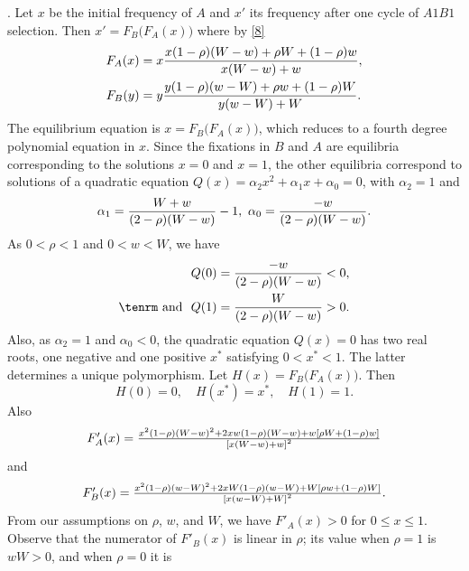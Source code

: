 \documentclass[9pt,twocolumn,twoside,lineno]{pnas-new}
\newcommand{\an}[1]{\begin{align}#1\end{align}}
\begin{document}
. Let $x$ be the initial frequency of $A$ and $x'$ its frequency  after one cycle of  $A1B1$ selection. Then $x' =F_B\bigl(F_A(x)\bigr)$ where by \eqref{8}
\begin{equation}
\an{
F_A(x)&=x{x(1-\rho)(W-w) +\rho W+(1-\rho)w\over x(W-w) +w},\\
F_B(y) &= y{y(1-\rho)(w-W) +\rho w+(1-\rho)W\over y(w-W)+W}.}
\label{21}\end{equation}
The equilibrium equation is $x=F_B\bigl(F_A(x)\bigr)$, which reduces to a fourth degree polynomial equation in $x$. Since the  fixations in $B$ and $A$ are equilibria corresponding to the  solutions $x=0$ and $x=1$, the other equilibria correspond to solutions of a quadratic equation $Q(x) =\alpha_2x^2 +\alpha_1x +\alpha_0=0$, with $\alpha_2=1$ and
\begin{equation}\alpha_1={W+w\over (2-\rho)(W-w)}-1,\  \alpha_0={-w\over (2-\rho)(W-w)}.\label{22}\end{equation}
As $0<\rho<1$ and $0<w<W$, we have
\begin{equation}
\an{
Q(0) &= {-w\over (2-\rho)(W-w)}<0,\\%
\hbox{\tenrm and}\ \ Q(1) &={W\over (2-\rho)(W-w)} >0.}\label{23}\end{equation}
Also, as $\alpha_2=1$ and $\alpha_0<0$, the quadratic equation $Q(x)=0$ has two real roots, one negative and one positive $x^*$ satisfying $0<x^*<1$. The latter determines a unique polymorphism. Let $H(x) =F_B\bigl(F_A(x)\bigr)$. Then 
 \begin{equation}H(0)=0,\quad H(x^*)=x^*,\quad H(1)=1.\label{24}\end{equation}
 Also 
\begin{equation}\begin{array}{ccc}
F'_A(x) = {x^2(1-\rho)\left(W-w\right)^2 +2xw(1-\rho)(W-w) +w\left[\rho W +(1-\rho)w\right]\over \left[x(W-w) +w\right]^2}\\
 \end{array}\label{25}\end{equation}
 and
\begin{equation}\begin{array}{ccc}
F'_B(x) = {x^2(1-\rho)\left(w-W\right)^2 +2xW(1-\rho)(w-W) +W\left[\rho w +(1-\rho)W\right]\over \left[x(w-W) +W\right]^2}.\\
\end{array}\label{26}\end{equation}
 From our assumptions on $\rho$, $w$, and $W$, we have $F'_A(x)>0$ for  $0\le x\le 1$. Observe that the numerator of $F'_B(x)$ is linear in $\rho$; its value when $\rho=1$ is $wW>0$, and when $\rho=0$ it is
\end{document}

